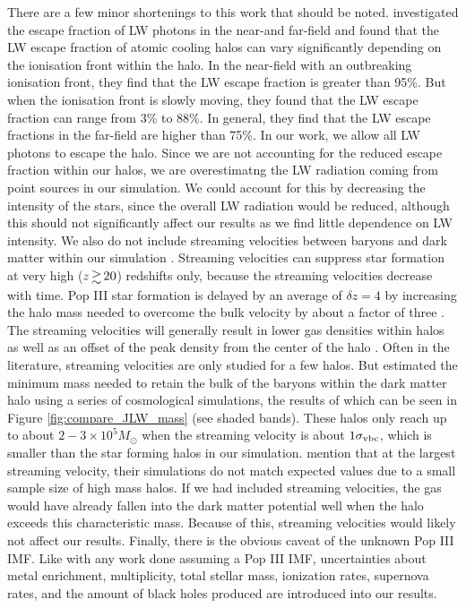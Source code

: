 \documentclass[a4paper,fleqn,usenatbib]{mnras}
\begin{document}
There are a few minor shortenings to this work that should be noted. \citet{Schauer17} investigated the escape fraction of LW photons in the near-and far-field and found that the LW escape fraction of atomic cooling halos can vary significantly depending on the ionisation front within the halo. In the near-field with an outbreaking ionisation front, they find that the LW escape fraction is greater than 95\%. But when the ionisation front is slowly moving, they found that the LW escape fraction can range from 3\% to 88\%. In general, they find that the LW escape fractions in the far-field are higher than 75\%. In our work, we allow all LW photons to escape the halo. Since we are not accounting for the reduced escape fraction within our halos, we are overestimatng the LW radiation coming from point sources in our simulation. We could account for this by decreasing the intensity of the stars, since the overall LW radiation would be reduced, although this should not significantly affect our results as we find little dependence on LW intensity. We also do not include streaming velocities between baryons and dark matter within our simulation \citep{Tselia11, Greif11_Delay, Naoz12, OLeary12}. Streaming velocities can suppress star formation at very high ($z \ga 20$) redshifts only, because the streaming velocities decrease with time. Pop III star formation is delayed by an average of $\delta z = 4$ by increasing the halo mass needed to overcome the bulk velocity by about a factor of three \citep{Greif11_Delay}. The streaming velocities will generally result in lower gas densities within halos as well as an offset of the peak density from the center of the halo \citep{OLeary12}. Often in the literature, streaming velocities are only studied for a few halos. But \citet{Naoz13} estimated the minimum mass needed to retain the bulk of the baryons within the dark matter halo using a series of cosmological simulations, the results of which can be seen in Figure \ref{fig:compare_JLW_mass} (see shaded bands). These halos only reach up to about $2 - 3 \times 10^5 M_\odot$ when the streaming velocity is about $1\sigma_{\rm vbc}$, which is smaller than the star forming halos in our simulation. \citet{Naoz13} mention that at the largest streaming velocity, their simulations do not match expected values due to a small sample size of high mass halos. If we had included streaming velocities, the gas would have already fallen into the dark matter potential well when the halo exceeds this characteristic mass. Because of this, streaming velocities would likely not affect our results. Finally, there is the obvious caveat of the unknown Pop III IMF. Like with any work done assuming a Pop III IMF, uncertainties about metal enrichment, multiplicity, total stellar mass, ionization rates, supernova rates, and the amount of black holes produced are introduced into our results.
\end{document}
